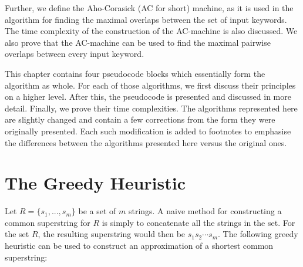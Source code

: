 \documentclass[english,twoside,censored,csm,algorithms-track-2020]{HYthesisML}
\theoremstyle{plain}
\theoremstyle{definition}
\begin{document}
Further, we define the Aho-Corasick (AC for short) machine, as it is used in the algorithm for finding
the maximal overlaps between the set of input keywords. The time complexity of the construction of
the AC-machine is also discussed. We also prove that the AC-machine can be used to find the maximal
pairwise overlaps between every input keyword.

This chapter contains four pseudocode blocks which essentially form the algorithm as whole.
For each of those algorithms, we first discuss their principles on a higher level. After this,
the pseudocode
is presented and discussed in more detail. Finally, we prove their time complexities.
The algorithms represented here are slightly changed and contain a few corrections from the form they
were originally presented. Each such modification is added to footnotes to emphasise the differences between
the algorithms presented here versus the original ones.



\section{The Greedy Heuristic}

  

Let $R=\{s_1,...,s_m\}$ be a set of $m$ strings. A naive method for constructing a common superstring
for $R$ is simply to concatenate all the strings in the set. For the set $R$, the resulting superstring
would then be $s_1s_2\cdots s_m$.
The following greedy heuristic can be used to construct an approximation of a shortest
common superstring:
\end{document}

